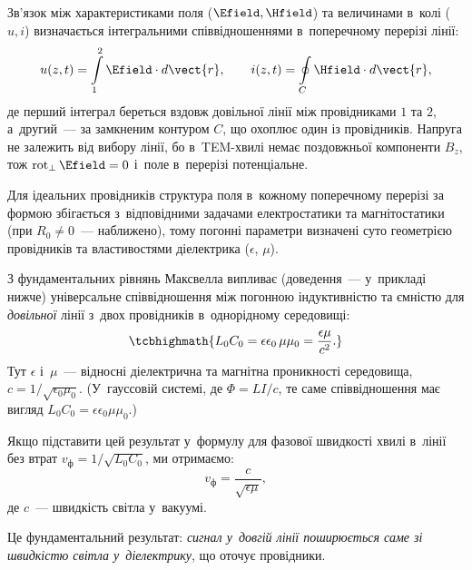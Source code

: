 Зв'язок між характеристиками поля ($\Efield, \Hfield$) та величинами в~колі ($u, i$) визначається інтегральними співвідношеннями в~поперечному перерізі лінії:
\begin{equation}\label{eq:field_to_circuit}
	u(z,t) = \int\limits_{1}^{2} \Efield \cdot d\vect{r}, \qquad
	i(z,t) = \oint\limits_{C} \Hfield \cdot d\vect{r},
\end{equation}
де перший інтеграл береться вздовж довільної лінії між провідниками $1$ та $2$, а~другий~--- за замкненим контуром $C$, що охоплює один із провідників. Напруга не залежить від вибору лінії, бо в~TEM-хвилі немає поздовжньої компоненти $B_z$, тож $\operatorname{rot}_\perp\Efield=0$ і~поле в~перерізі потенціальне.

Для ідеальних провідників структура поля в~кожному поперечному перерізі за формою збігається з~відповідними задачами електростатики та магнітостатики (при $R_0\neq0$~--- наближено), тому погонні параметри визначені суто геометрією провідників та властивостями діелектрика ($\epsilon$, $\mu$).

З фундаментальних рівнянь Максвелла випливає (доведення~--- у~прикладі нижче) універсальне співвідношення між погонною індуктивністю та ємністю для \emph{довільної} лінії з~двох провідників в~однорідному середовищі:
\begin{equation}\label{eq:L0C0_universal}
	\tcbhighmath{
		L_0 C_0 = \epsilon\epsilon_0\,\mu\mu_0 = \frac{\epsilon\mu}{c^2}.
	}
\end{equation}
Тут $\epsilon$ і~$\mu$~--- відносні діелектрична та магнітна проникності середовища, $c=1/\sqrt{\epsilon_0\mu_0}$. (У~гауссовій системі, де $\Phi=LI/c$, те саме співвідношення має вигляд $L_0C_0=\epsilon\epsilon_0\mu\mu_0$.)

Якщо підставити цей результат у~формулу для фазової швидкості хвилі в~лінії без втрат $v_{\text{ф}} = 1/\sqrt{L_0 C_0}$, ми отримаємо:
\begin{equation}\label{eq:phase_vel_maxwell}
	v_{\text{ф}} = \frac{c}{\sqrt{\epsilon \mu}},
\end{equation}
де $c$~--- швидкість світла у~вакуумі.

Це фундаментальний результат: \emph{сигнал у~довгій лінії поширюється саме зі швидкістю світла у~діелектрику}, що оточує провідники.

